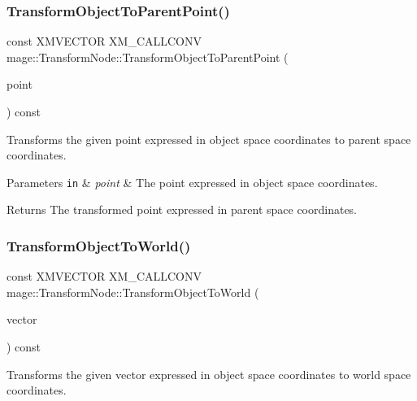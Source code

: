 \subsubsection{\texorpdfstring{Transform\+Object\+To\+Parent\+Point()}{TransformObjectToParentPoint()}}
{\footnotesize\ttfamily const X\+M\+V\+E\+C\+T\+OR X\+M\+\_\+\+C\+A\+L\+L\+C\+O\+NV mage\+::\+Transform\+Node\+::\+Transform\+Object\+To\+Parent\+Point (\begin{DoxyParamCaption}\item[{F\+X\+M\+V\+E\+C\+T\+OR}]{point }\end{DoxyParamCaption}) const\hspace{0.3cm}{\ttfamily [noexcept]}}

Transforms the given point expressed in object space coordinates to parent space coordinates.


\begin{DoxyParams}[1]{Parameters}
\mbox{\tt in}  & {\em point} & The point expressed in object space coordinates. \\
\hline
\end{DoxyParams}
\begin{DoxyReturn}{Returns}
The transformed point expressed in parent space coordinates. 
\end{DoxyReturn}
\hypertarget{classmage_1_1_transform_node_a93cad83498de7702b0c888260862ec39}{}\label{classmage_1_1_transform_node_a93cad83498de7702b0c888260862ec39} 
\subsubsection{\texorpdfstring{Transform\+Object\+To\+World()}{TransformObjectToWorld()}}
{\footnotesize\ttfamily const X\+M\+V\+E\+C\+T\+OR X\+M\+\_\+\+C\+A\+L\+L\+C\+O\+NV mage\+::\+Transform\+Node\+::\+Transform\+Object\+To\+World (\begin{DoxyParamCaption}\item[{F\+X\+M\+V\+E\+C\+T\+OR}]{vector }\end{DoxyParamCaption}) const\hspace{0.3cm}{\ttfamily [noexcept]}}

Transforms the given vector expressed in object space coordinates to world space coordinates.


